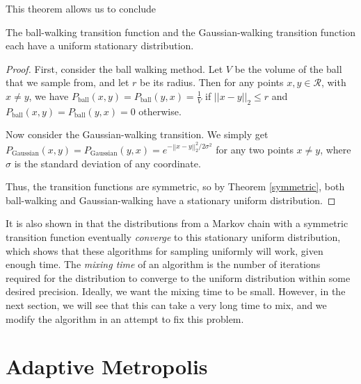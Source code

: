 \documentclass[11pt]{article}
\begin{document}
This theorem allows us to conclude
\begin{proposition}
The ball-walking transition function and the Gaussian-walking transition function each have a uniform stationary distribution.
\end{proposition}
\begin{proof}
First, consider the ball walking method. Let $V$ be the volume of the ball that we sample from, and let $r$ be its radius. Then for any points $x,y\in\mathcal{R}$, with $x\ne y$, we have $P_\text{ball}(x,y) = P_\text{ball}(y,x) = \frac{1}{V}$ if $||x-y||_2 \le r$ and $P_\text{ball}(x,y) = P_\text{ball}(y,x) = 0$ otherwise.

Now consider the Gaussian-walking transition. We simply get $P_\text{Gaussian}(x,y) = P_\text{Gaussian}(y,x) = e^{-||x-y||_2^2 / 2\sigma^2}$ for any two points $x\ne y$, where $\sigma$ is the standard deviation of any coordinate.

Thus, the transition functions are symmetric, so by Theorem \ref{symmetric}, both ball-walking and Gaussian-walking have a stationary uniform distribution.
\end{proof}

It is also shown in \cite{Smith} that the distributions from a Markov chain with a symmetric transition function eventually \emph{converge} to this stationary uniform distribution, which shows that these algorithms for sampling uniformly will work, given enough time. The \emph{mixing time} of an algorithm is the number of iterations required for the distribution to converge to the uniform distribution within some desired precision. Ideally, we want the mixing time to be small. However, in the next section, we will see that this can take a very long time to mix, and we modify the algorithm in an attempt to fix this problem.


\section{Adaptive Metropolis}\label{adapt}
\end{document}
